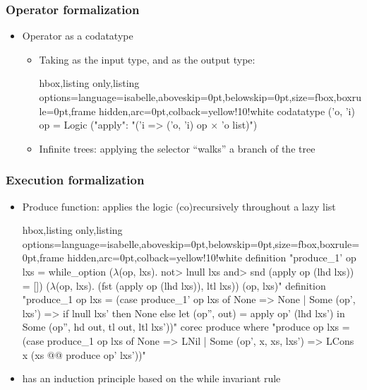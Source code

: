 \documentclass[aspectratio=169,10pt]{beamer}
\begin{document}
\begin{frame}[fragile]
  \frametitle{Operator formalization}
  \begin{itemize}
    \item Operator as a codatatype
          \begin{itemize}
            \item Taking  as the input type, and  as the output type:
\vspace*{-1.5ex}
\begin{tcblisting}{hbox,listing only,listing options={language=isabelle,aboveskip=0pt,belowskip=0pt},size=fbox,boxrule=0pt,frame hidden,arc=0pt,colback=yellow!10!white}
codatatype ('o, 'i) op = Logic ("apply": "('i => ('o, 'i) op $\times$ 'o list)")
\end{tcblisting}
\vspace*{-1.5ex}
          \pause
            \item Infinite trees: applying the selector  ``walks'' a branch of the tree
          \end{itemize}
  \end{itemize}
\end{frame}

\begin{frame}[fragile]
  \frametitle{Execution formalization}
  \begin{itemize}
    \item Produce function: applies the logic (co)recursively throughout a lazy list
\vspace*{-1.5ex}
\begin{tcblisting}{hbox,listing only,listing options={language=isabelle,aboveskip=0pt,belowskip=0pt},size=fbox,boxrule=0pt,frame hidden,arc=0pt,colback=yellow!10!white}
definition "produce_1' op lxs = while_option
  ($\lambda$(op, lxs). \<not> lnull lxs \<and> snd (apply op (lhd lxs)) = [])
  ($\lambda$(op, lxs). (fst (apply op (lhd lxs)), ltl lxs)) (op, lxs)"
definition "produce_1 op lxs =
  (case produce_1' op lxs of None => None
  | Some (op', lxs') => if lnull lxs' then None else
    let (op'', out) = apply op' (lhd lxs') in Some (op'', hd out, tl out, ltl lxs'))"
corec produce where
  "produce op lxs = (case produce_1 op lxs of None => LNil
    | Some (op', x, xs, lxs') => LCons x (xs @@ produce op' lxs'))"
\end{tcblisting}
\vspace*{-1.5ex}
          \pause
          \item {} has an induction principle based on the while invariant rule
  \end{itemize}
\end{frame}
\end{document}
